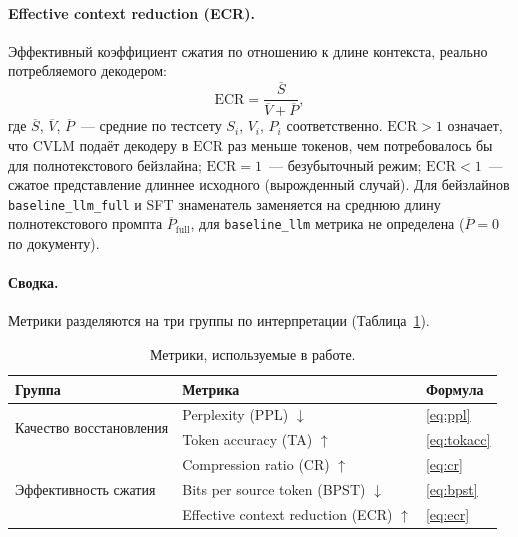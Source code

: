 \documentclass[a4paper,12pt]{extarticle}
\begin{document}
\paragraph{Effective context reduction (ECR).} Эффективный коэффициент сжатия по отношению к длине контекста, реально потребляемого декодером:
\begin{equation}
\label{eq:ecr}
    \mathrm{ECR} = \frac{\overline{S}}{\overline{V} + \overline{P}},
\end{equation}
где $\overline{S}$, $\overline{V}$, $\overline{P}$~--- средние по тестсету $S_i$, $V_i$, $P_i$ соответственно. $\mathrm{ECR} > 1$ означает, что CVLM подаёт декодеру в $\mathrm{ECR}$ раз меньше токенов, чем потребовалось бы для полнотекстового бейзлайна; $\mathrm{ECR} = 1$~--- безубыточный режим; $\mathrm{ECR} < 1$~--- сжатое представление длиннее исходного (вырожденный случай). Для бейзлайнов \texttt{baseline\_llm\_full} и SFT знаменатель заменяется на среднюю длину полнотекстового промпта $\overline{P}_{\text{full}}$, для \texttt{baseline\_llm} метрика не определена ($\overline{P} = 0$ по документу).

\paragraph{Сводка.} Метрики разделяются на три группы по интерпретации (Таблица~\ref{tab:metrics-summary}).

\begin{table}[ht]
\centering
\caption{Метрики, используемые в работе.}
\label{tab:metrics-summary}
\footnotesize
\begin{tabular}{lll}
\toprule
\textbf{Группа} & \textbf{Метрика} & \textbf{Формула} \\
\midrule
\multirow{2}{*}{Качество восстановления} & Perplexity (PPL) $\downarrow$  & \eqref{eq:ppl} \\
                                                  & Token accuracy (TA) $\uparrow$ & \eqref{eq:tokacc} \\
\midrule
\multirow{3}{*}{Эффективность сжатия}             & Compression ratio (CR) $\uparrow$   & \eqref{eq:cr} \\
                                                  & Bits per source token (BPST) $\downarrow$ & \eqref{eq:bpst} \\
                                                  & Effective context reduction (ECR) $\uparrow$ & \eqref{eq:ecr} \\
\bottomrule
\end{tabular}
\end{table}
\end{document}
